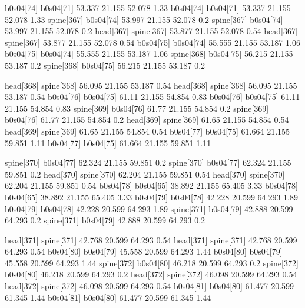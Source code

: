 b0s04[74]    b0s04[71]    53.337    21.155    52.078    1.33
b0s04[74]    b0s04[71]    53.337    21.155    52.078    1.33
spine[367]    b0s04[74]    53.997    21.155    52.078    0.2
spine[367]    b0s04[74]    53.997    21.155    52.078    0.2
head[367]    spine[367]    53.877    21.155    52.078    0.54
head[367]    spine[367]    53.877    21.155    52.078    0.54
b0s04[75]    b0s04[74]    55.555    21.155    53.187    1.06
b0s04[75]    b0s04[74]    55.555    21.155    53.187    1.06
spine[368]    b0s04[75]    56.215    21.155    53.187    0.2
spine[368]    b0s04[75]    56.215    21.155    53.187    0.2


head[368]    spine[368]    56.095    21.155    53.187    0.54
head[368]    spine[368]    56.095    21.155    53.187    0.54
b0s04[76]    b0s04[75]    61.11    21.155    54.854    0.83
b0s04[76]    b0s04[75]    61.11    21.155    54.854    0.83
spine[369]    b0s04[76]    61.77    21.155    54.854    0.2
spine[369]    b0s04[76]    61.77    21.155    54.854    0.2
head[369]    spine[369]    61.65    21.155    54.854    0.54
head[369]    spine[369]    61.65    21.155    54.854    0.54
b0s04[77]    b0s04[75]    61.664    21.155    59.851    1.11
b0s04[77]    b0s04[75]    61.664    21.155    59.851    1.11


spine[370]    b0s04[77]    62.324    21.155    59.851    0.2
spine[370]    b0s04[77]    62.324    21.155    59.851    0.2
head[370]    spine[370]    62.204    21.155    59.851    0.54
head[370]    spine[370]    62.204    21.155    59.851    0.54
b0s04[78]    b0s04[65]    38.892    21.155    65.405    3.33
b0s04[78]    b0s04[65]    38.892    21.155    65.405    3.33
b0s04[79]    b0s04[78]    42.228    20.599    64.293    1.89
b0s04[79]    b0s04[78]    42.228    20.599    64.293    1.89
spine[371]    b0s04[79]    42.888    20.599    64.293    0.2
spine[371]    b0s04[79]    42.888    20.599    64.293    0.2


head[371]    spine[371]    42.768    20.599    64.293    0.54
head[371]    spine[371]    42.768    20.599    64.293    0.54
b0s04[80]    b0s04[79]    45.558    20.599    64.293    1.44
b0s04[80]    b0s04[79]    45.558    20.599    64.293    1.44
spine[372]    b0s04[80]    46.218    20.599    64.293    0.2
spine[372]    b0s04[80]    46.218    20.599    64.293    0.2
head[372]    spine[372]    46.098    20.599    64.293    0.54
head[372]    spine[372]    46.098    20.599    64.293    0.54
b0s04[81]    b0s04[80]    61.477    20.599    61.345    1.44
b0s04[81]    b0s04[80]    61.477    20.599    61.345    1.44


